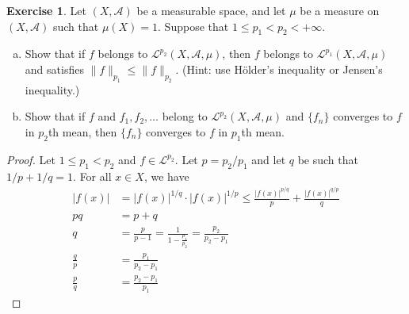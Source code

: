 \documentclass[11pt,a4paper,twoside]{article}
\theoremstyle{definition}
\newcounter{excounter}
\newtheorem{exercise}[excounter]{Exercise}
\begin{document}
\begin{exercise}

  Let $(X, \mathscr{A})$ be a measurable space, and let $\mu$ be a measure on $(X, \mathscr{A})$ such that $\mu ( X ) = 1$.
  Suppose that $1 \leq p_1 < p_2 < +\infty$.
  \begin{enumerate}[(a)]
  \item Show that if $f$ belongs to $\mathscr{L}^{p_2} ( X, \mathscr{A}, \mu )$, then $f$ belongs to $\mathscr{L}^{p_1} ( X, \mathscr{A}, \mu )$
    and satisfies $\| f \|_{p_1} \leq \| f \|_{p_2}$. (Hint: use H\"older's inequality or Jensen's inequality.)
  \item Show that if $f$ and $f_1, f_2, \dotsc$ belong to $\mathscr{L}^{p_2} ( X, \mathscr{A}, \mu )$ and $\{ f_n \}$ converges to $f$ in ${p_2}$th mean,
    then $\{ f_n \}$ converges to $f$ in $p_1$th mean.
  \end{enumerate}

\end{exercise}

\begin{proof}\hfill

\item Let $1 \leq p_1 < p_2$ and $f \in \mathscr{L}^{p_2}$. Let $p = p_2 / p_1$ and let $q$ be such that $1 / p + 1 / q = 1$.
  For all $x \in X$, we have
  \begin{align*}
    | f (x) | &= | f (x) |^{1 / q} \cdot | f (x) |^{1 / p} \leq \frac{ | f (x) |^{p / q} }{p} + \frac{ | f (x) |^{q / p} }{q} \\
    pq &= p + q \\
    q &= \frac{p}{p - 1} = \frac{1}{1 - \frac{p_1}{p_2} } = \frac{p_2}{p_2 - p_1} \\
    \frac{q}{p} &= \frac{p_1}{p_2 - p_1} \\
    \frac{p}{q} &= \frac{p_2 - p_1}{p_1}
  \end{align*}

\end{proof}
\end{document}
